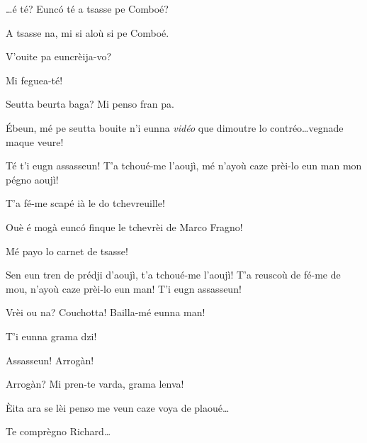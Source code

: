 \begin{drama}
\Saventaspeaks{} \ldots é té? Eunc\'o té a tsasse pe Comboé?

\Richardspeaks A tsasse na, mi si aloù si pe Comboé.

\Saventaspeaks V'ouite pa euncrèija-vo?

\Richardspeaks Mi feguea-té!

\Tuenospeaks{} Seutta beurta baga? Mi penso fran pa.

\Saventaspeaks \'Ebeun, mé pe seutta bouite  n'i eunna \textit{vidéo} que dimoutre lo contréo\ldots vegnade maque veure! 





\Richardspeaks Té t'i eugn assasseun! T'a tchoué-me l'aoujì, mé n'ayoù caze prèi-lo eun man mon pégno aoujì!

\Tuenospeaks T'a fé-me scapé ià le do tchevreuille!

\Richardspeaks Ouè é mogà eunc\'o finque le tchevrèi de Marco Fragno!

\Tuenospeaks Mé payo lo carnet de tsasse!

\Richardspeaks Sen eun tren de prédji d'aoujì, t'a tchoué-me l'aoujì! T'a reuscoù de fé-me de mou, n'ayoù caze prèi-lo eun man! T'i eugn assasseun!

\Richardspeaks{} Vrèi ou na? Couchotta! Bailla-mé eunna man!

\Gerominespeaks{} T'i eunna grama dzi!

\Richardspeaks Assasseun! Arrogàn!


\Tuenospeaks Arrogàn? Mi pren-te varda, grama lenva!

\Richardspeaks \`Eita ara se lèi penso me veun caze voya de plaoué\ldots

\Gerominespeaks{} Te comprègno Richard\ldots


\end{drama}
